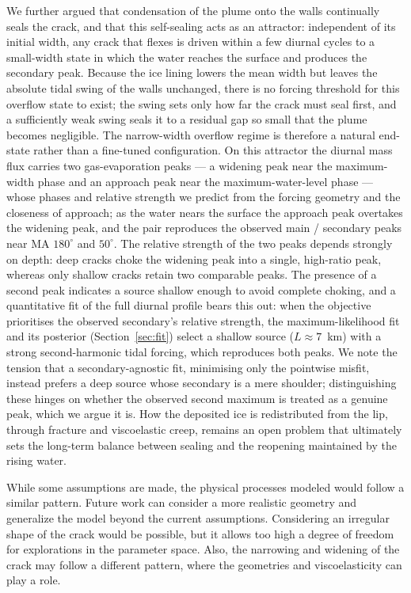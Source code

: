 \documentclass[draft]{agujournal2019}
\begin{document}
We further argued that condensation of the plume onto the walls continually seals the crack, and that this self-sealing acts as an attractor: independent of its initial width, any crack that flexes is driven within a few diurnal cycles to a small-width state in which the water reaches the surface and produces the secondary peak. Because the ice lining lowers the mean width but leaves the absolute tidal swing of the walls unchanged, there is no forcing threshold for this overflow state to exist; the swing sets only how far the crack must seal first, and a sufficiently weak swing seals it to a residual gap so small that the plume becomes negligible. The narrow-width overflow regime is therefore a natural end-state rather than a fine-tuned configuration. On this attractor the diurnal mass flux carries two gas-evaporation peaks --- a widening peak near the maximum-width phase and an approach peak near the maximum-water-level phase --- whose phases and relative strength we predict from the forcing geometry and the closeness of approach; as the water nears the surface the approach peak overtakes the widening peak, and the pair reproduces the observed main / secondary peaks near MA $180^\circ$ and $50^\circ$. The relative strength of the two peaks depends strongly on depth: deep cracks choke the widening peak into a single, high-ratio peak, whereas only shallow cracks retain two comparable peaks. The presence of a second peak indicates a source shallow enough to avoid complete choking, and a quantitative fit of the full diurnal profile bears this out: when the objective prioritises the observed secondary's relative strength, the maximum-likelihood fit and its posterior (Section~\ref{sec:fit}) select a shallow source ($L\approx7$~km) with a strong second-harmonic tidal forcing, which reproduces both peaks. We note the tension that a secondary-agnostic fit, minimising only the pointwise misfit, instead prefers a deep source whose secondary is a mere shoulder; distinguishing these hinges on whether the observed second maximum is treated as a genuine peak, which we argue it is. How the deposited ice is redistributed from the lip, through fracture and viscoelastic creep, remains an open problem that ultimately sets the long-term balance between sealing and the reopening maintained by the rising water.

While some assumptions are made, the physical processes modeled would follow a similar pattern. Future work can consider a more realistic geometry and generalize the model beyond the current assumptions. Considering an irregular shape of the crack would be possible, but it allows too high a degree of freedom for explorations in the parameter space. Also, the narrowing and widening of the crack may follow a different pattern, where the geometries and viscoelasticity can play a role. 
\end{document}
